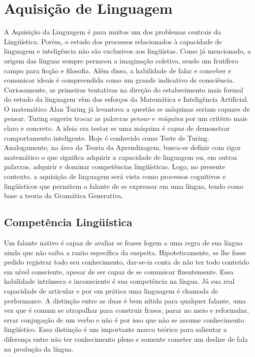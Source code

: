 
\section{Aquisição de Linguagem}

A Aquisição da Linguagem é para muitos um dos problemas centrais da Lingüística. Porém, o estudo dos processos relacionados à capacidade de linguagem e inteligência não são exclusivos aos lingüistas. Como já mencionado, a origem das línguas sempre permeou a imaginação coletiva, sendo um frutífero campo para ficção e filosofia. Além disso, a habilidade de falar e conceber e comunicar ideais é compreendida como um grande indicativo de consciência. Curiosamente, as primeiras tentativas na direção do estabecimento mais formal do estudo da linguagem vêm dos esforços da Matemática e Inteligência Artificial. O matemático Alan Turing \citep{turing1950computing} já levantava a questão se máquinas seriam capazes de pensar. Turing sugeriu trocar as palavras \emph{pensar} e \emph{máquina} por um critério mais claro e concreto. A ideia era testar se uma máquina é capaz de demonstrar comportamento inteligente. Hoje é conhecido como Teste de Turing. Analogamente, na área da Teoria  da Aprendizagem, busca-se definir com rigor matemático o que significa adquirir a capacidade de linguagem ou, em outras palavras, adquirir e dominar competências lingüísticas. Logo, no presente contexto, a aquisição de linguagem será vista como processos cognitivos e lingüísticos que permitem o falante de se expressar em uma língua, tendo como base a teoria da Gramática Generativa.

\subsection{Competência Lingüística}

Um falante nativo é capaz de avaliar se frases fogem a uma regra de sua língua ainda que não saiba a razão específica da suspeita. Hipoteticamente, se lhe fosse pedido registrar todo seu conhecimento, dar-se-ia conta de não ter todo conteúdo em nível consciente, apesar de ser capaz de se comunicar fluentemente. Essa habilidade intrínseca e inconsciente é sua competência na língua. Já sua real capacidade de articular e por em prática uma linguagem é chamada de performance.
 A distinção entre as duas é bem nítida para qualquer falante, uma vez que é comum se atrapalhar para construir frases, parar no meio e reformular, errar conjugação de um verbo e não é por isso que não se assume conhecimento lingüístico. Essa distinção é um importante marco teórico \citep{chomsky65} para salientar a diferença entre não ter conhecimento pleno e somente cometer um deslize de fala na produção da língua. \\
 
